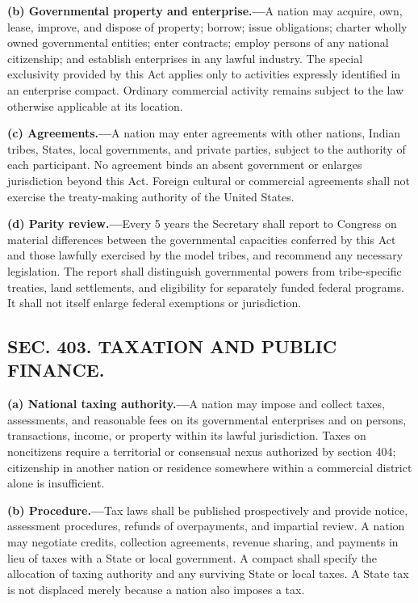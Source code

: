 \documentclass[12pt,letterpaper]{article}
\begin{document}
\textbf{(b) Governmental property and enterprise.---}A nation may acquire, own, lease, improve, and dispose of property; borrow; issue obligations; charter wholly owned governmental entities; enter contracts; employ persons of any national citizenship; and establish enterprises in any lawful industry. The special exclusivity provided by this Act applies only to activities expressly identified in an enterprise compact. Ordinary commercial activity remains subject to the law otherwise applicable at its location.

\textbf{(c) Agreements.---}A nation may enter agreements with other nations, Indian tribes, States, local governments, and private parties, subject to the authority of each participant. No agreement binds an absent government or enlarges jurisdiction beyond this Act. Foreign cultural or commercial agreements shall not exercise the treaty-making authority of the United States.

\textbf{(d) Parity review.---}Every 5 years the Secretary shall report to Congress on material differences between the governmental capacities conferred by this Act and those lawfully exercised by the model tribes, and recommend any necessary legislation. The report shall distinguish governmental powers from tribe-specific treaties, land settlements, and eligibility for separately funded federal programs. It shall not itself enlarge federal exemptions or jurisdiction.

\subsection*{SEC. 403. TAXATION AND PUBLIC FINANCE.}

\textbf{(a) National taxing authority.---}A nation may impose and collect taxes, assessments, and reasonable fees on its governmental enterprises and on persons, transactions, income, or property within its lawful jurisdiction. Taxes on noncitizens require a territorial or consensual nexus authorized by section 404; citizenship in another nation or residence somewhere within a commercial district alone is insufficient.

\textbf{(b) Procedure.---}Tax laws shall be published prospectively and provide notice, assessment procedures, refunds of overpayments, and impartial review. A nation may negotiate credits, collection agreements, revenue sharing, and payments in lieu of taxes with a State or local government. A compact shall specify the allocation of taxing authority and any surviving State or local taxes. A State tax is not displaced merely because a nation also imposes a tax.
\end{document}
